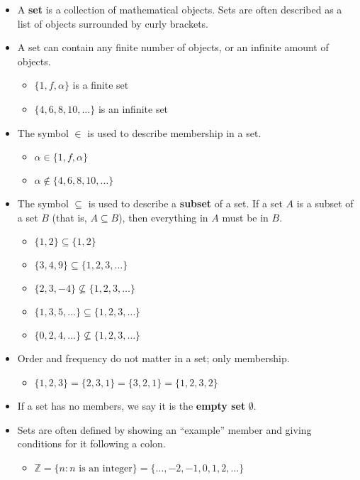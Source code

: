 \documentclass[12pt]{article}
\theoremstyle{plain}
\theoremstyle{definition}
\theoremstyle{remark}
\begin{document}
		\begin{itemize}
		\item A \textbf{set} is a collection of mathematical objects. Sets are often described as a list of objects surrounded by curly brackets.
		\item A set can contain any finite number of objects, or an infinite amount of objects.
			\begin{itemize}
			\item $\{1,f,\alpha\}$ is a finite set
			\item $\{4,6,8,10,\dots\}$ is an infinite set
			\end{itemize}
		\item The symbol $\in$ is used to describe membership in a set.
			\begin{itemize}
			\item $\alpha \in \{1,f,\alpha\}$
			\item $\alpha \not\in \{4,6,8,10,\dots\}$
			\end{itemize}
		\item The symbol $\subseteq$ is used to describe a \textbf{subset} of a set. If a set $A$ is a subset of a set $B$ (that is, $A\subseteq B$), then everything in $A$ must be in $B$.
			\begin{itemize}
			\item $\{1,2\} \subseteq \{1,2\}$
			\item $\{3,4,9\} \subseteq \{1,2,3,\dots\}$
			\item $\{2,3,-4\} \not\subseteq \{1,2,3,\dots\}$
			\item $\{1,3,5,\dots\} \subseteq \{1,2,3,\dots\}$
			\item $\{0,2,4,\dots\} \not\subseteq \{1,2,3,\dots\}$
			\end{itemize}
		\item Order and frequency do not matter in a set; only membership.
			\begin{itemize}
			\item $\{1,2,3\} = \{2,3,1\} = \{3,2,1\} = \{1,2,3,2\}$
			\end{itemize}
		\item If a set has no members, we say it is the \textbf{empty set} $\emptyset$.
		\item Sets are often defined by showing an ``example'' member and giving conditions for it following a colon.
			\begin{itemize} 
			\item $\mathbb{Z}  = \{n : n \text{ is an integer}\} = \{\dots,-2,-1,0,1,2,\dots\}$

\end{itemize}
\end{itemize}
\end{document}

